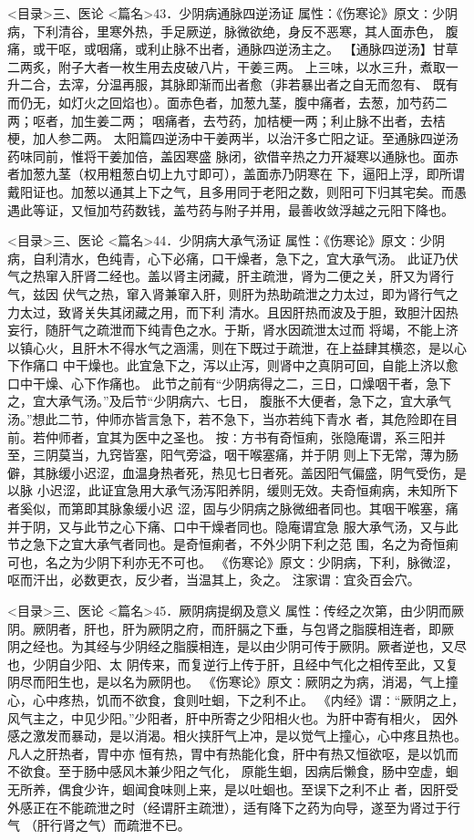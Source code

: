 \documentclass[a4paper,12pt,UTF8,twoside]{ctexbook}
\begin{document}
<目录>三、医论
<篇名>43．少阴病通脉四逆汤证
属性：《伤寒论》原文∶少阴病，下利清谷，里寒外热，手足厥逆，脉微欲绝，身反不恶寒，其人面赤色， 
腹痛，或干呕，或咽痛，或利止脉不出者，通脉四逆汤主之。 
【通脉四逆汤】甘草二两炙，附子大者一枚生用去皮破八片，干姜三两。 
上三味，以水三升，煮取一升二合，去滓，分温再服，其脉即渐而出者愈（非若暴出者之自无而忽有、 
既有而仍无，如灯火之回焰也）。面赤色者，加葱九茎，腹中痛者，去葱，加芍药二两；呕者，加生姜二两； 
咽痛者，去芍药，加桔梗一两；利止脉不出者，去桔梗，加人参二两。 
太阳篇四逆汤中干姜两半，以治汗多亡阳之证。至通脉四逆汤药味同前，惟将干姜加倍，盖因寒盛 
脉闭，欲借辛热之力开凝寒以通脉也。面赤者加葱九茎（权用粗葱白切上九寸即可），盖面赤乃阴寒在 
下，逼阳上浮，即所谓戴阳证也。加葱以通其上下之气，且多用同于老阳之数，则阳可下归其宅矣。而愚 
遇此等证，又恒加芍药数钱，盖芍药与附子并用，最善收敛浮越之元阳下降也。 

<目录>三、医论
<篇名>44．少阴病大承气汤证
属性：《伤寒论》原文∶少阴病，自利清水，色纯青，心下必痛，口干燥者，急下之，宜大承气汤。 
此证乃伏气之热窜入肝肾二经也。盖以肾主闭藏，肝主疏泄，肾为二便之关，肝又为肾行气，兹因 
伏气之热，窜入肾兼窜入肝，则肝为热助疏泄之力太过，即为肾行气之力太过，致肾关失其闭藏之用，而下利 
清水。且因肝热而波及于胆，致胆汁因热妄行，随肝气之疏泄而下纯青色之水。于斯，肾水因疏泄太过而 
将竭，不能上济以镇心火，且肝木不得水气之涵濡，则在下既过于疏泄，在上益肆其横恣，是以心下作痛口 
中干燥也。此宜急下之，泻以止泻，则肾中之真阴可回，自能上济以愈口中干燥、心下作痛也。 
此节之前有“少阴病得之二，三日，口燥咽干者，急下之，宜大承气汤。”及后节“少阴病六、七日， 
腹胀不大便者，急下之，宜大承气汤。”想此二节，仲师亦皆言急下，若不急下，当亦若纯下青水 
者，其危险即在目前。若仲师者，宜其为医中之圣也。 
按∶方书有奇恒痢，张隐庵谓，系三阳并至，三阴莫当，九窍皆塞，阳气旁溢，咽干喉塞痛，并于阴 
则上下无常，薄为肠僻，其脉缓小迟涩，血温身热者死，热见七日者死。盖因阳气偏盛，阴气受伤，是以脉 
小迟涩，此证宜急用大承气汤泻阳养阴，缓则无效。夫奇恒痢病，未知所下者奚似，而第即其脉象缓小迟 
涩，固与少阴病之脉微细者同也。其咽干喉塞，痛并于阴，又与此节之心下痛、口中干燥者同也。隐庵谓宜急 
服大承气汤，又与此节之急下之宜大承气者同也。是奇恒痢者，不外少阴下利之范 
围，名之为奇恒痢可也，名之为少阴下利亦无不可也。 
《伤寒论》原文∶少阴病，下利，脉微涩，呕而汗出，必数更衣，反少者，当温其上，灸之。 
注家谓∶宜灸百会穴。 

<目录>三、医论
<篇名>45．厥阴病提纲及意义
属性：传经之次第，由少阴而厥阴。厥阴者，肝也，肝为厥阴之府，而肝膈之下垂，与包肾之脂膜相连者，即厥 
阴之经也。为其经与少阴经之脂膜相连，是以由少阴可传于厥阴。厥者逆也，又尽也，少阴自少阳、太 
阴传来，而复逆行上传于肝，且经中气化之相传至此，又复阴尽而阳生也，是以名为厥阴也。 
《伤寒论》原文∶厥阴之为病，消渴，气上撞心，心中疼热，饥而不欲食，食则吐蛔，下之利不止。 
《内经》谓∶“厥阴之上，风气主之，中见少阳。”少阳者，肝中所寄之少阳相火也。为肝中寄有相火， 
因外感之激发而暴动，是以消渴。相火挟肝气上冲，是以觉气上撞心，心中疼且热也。凡人之肝热者，胃中亦 
恒有热，胃中有热能化食，肝中有热又恒欲呕，是以饥而不欲食。至于肠中感风木兼少阳之气化， 
原能生蛔，因病后懒食，肠中空虚，蛔无所养，偶食少许，蛔闻食味则上来，是以吐蛔也。至误下之利不止 
者，因肝受外感正在不能疏泄之时（经谓肝主疏泄），适有降下之药为向导，遂至为肾过于行气 
（肝行肾之气）而疏泄不已。 
\end{document}
